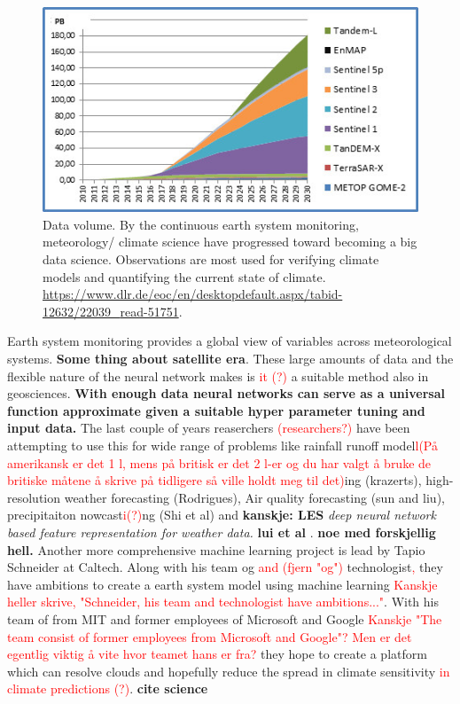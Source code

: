 \begin{figure}[h]
    \centering
    \includegraphics{Chapter1_Intro/images/Datenvolumen_D-SDA.jpg}
    \caption{Data volume. By the continuous earth system monitoring, meteorology/ climate science have progressed toward becoming a big data science. Observations are most used for verifying climate models and quantifying the current state of climate. \href{https://www.dlr.de/eoc/en/desktopdefault.aspx/tabid-12632/22039_read-51751}{https://www.dlr.de/eoc/en/desktopdefault.aspx/tabid-12632/22039{\_}read-51751}.}
    \label{fig:data_volum_sat}
\end{figure}
Earth system monitoring provides a global view of variables across meteorological systems. \textbf{Some thing about satellite era}. These large amounts of data and the flexible nature of the neural network makes is \textcolor{red}{it (?)} a suitable method also in geosciences. \textbf{With enough data neural networks can serve as a universal function approximate given a suitable hyper parameter tuning and input data.} The last couple of years reaserchers \textcolor{red}{(researchers?)} have been attempting to use this for wide range of problems like rainfall runoff model\textcolor{red}{l(På amerikansk er det 1 l, mens på britisk er det 2 l-er og du har valgt å bruke de britiske måtene å skrive på tidligere så ville holdt meg til det)}ing (krazerts), high-resolution weather forecasting (Rodrigues), Air quality forecasting (sun and liu), precipitaiton nowcast\textcolor{red}{i(?)}ng (Shi et al) and \textbf{kanskje: LES} \textit{deep neural network based feature representation for weather data.} \textbf{lui et al }. \textbf{noe med forskjellig hell.} Another more comprehensive machine learning project is lead by Tapio Schneider at Caltech. Along with his team og \textcolor{red}{and (fjern "og")} technologist\textcolor{red}{,} they have ambitions to create a earth system model using machine learning \textcolor{red}{Kanskje heller skrive, "Schneider, his team and technologist have ambitions..."}. With his team of from MIT and former employees of Microsoft and Google \textcolor{red}{Kanskje "The team consist of former employees from Microsoft and Google"? Men er det egentlig viktig å vite hvor teamet hans er fra? }they hope to create a platform which can resolve clouds and hopefully reduce the spread in climate sensitivity \textcolor{red}{in climate predictions (?)}. \textbf{cite science}


